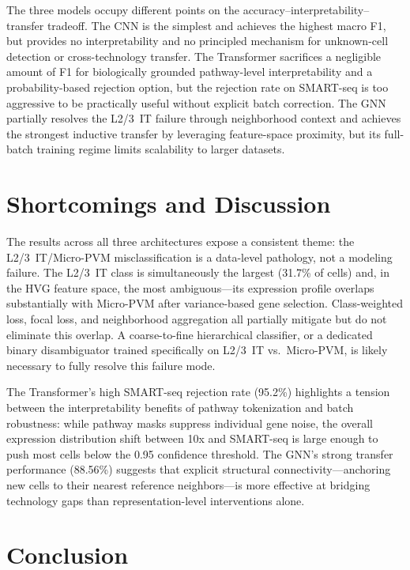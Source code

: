 \documentclass[11pt,letterpaper]{article}
\begin{document}
\noindent The three models occupy different points on the accuracy--interpretability--transfer
tradeoff. The CNN is the simplest and achieves the highest macro F1, but provides
no interpretability and no principled mechanism for unknown-cell detection or
cross-technology transfer. The Transformer sacrifices a negligible amount of F1
for biologically grounded pathway-level interpretability and a probability-based
rejection option, but the rejection rate on SMART-seq is too aggressive to be
practically useful without explicit batch correction. The GNN partially resolves
the L2/3~IT failure through neighborhood context and achieves the strongest
inductive transfer by leveraging feature-space proximity, but its full-batch
training regime limits scalability to larger datasets.

\section{Shortcomings and Discussion}

The results across all three architectures expose a consistent theme: the
L2/3~IT/Micro-PVM misclassification is a data-level pathology, not a modeling
failure. The L2/3~IT class is simultaneously the largest (31.7\% of cells) and,
in the HVG feature space, the most ambiguous---its expression profile overlaps
substantially with Micro-PVM after variance-based gene selection. Class-weighted
loss, focal loss, and neighborhood aggregation all partially mitigate but do not
eliminate this overlap. A coarse-to-fine hierarchical classifier, or a dedicated
binary disambiguator trained specifically on L2/3~IT vs.\ Micro-PVM, is likely
necessary to fully resolve this failure mode.

The Transformer's high SMART-seq rejection rate (95.2\%) highlights a tension
between the interpretability benefits of pathway tokenization and batch
robustness: while pathway masks suppress individual gene noise, the overall
expression distribution shift between 10x and SMART-seq is large enough to push
most cells below the 0.95 confidence threshold. The GNN's strong transfer
performance (88.56\%) suggests that explicit structural connectivity---anchoring
new cells to their nearest reference neighbors---is more effective at bridging
technology gaps than representation-level interventions alone.

\section{Conclusion}
\end{document}
